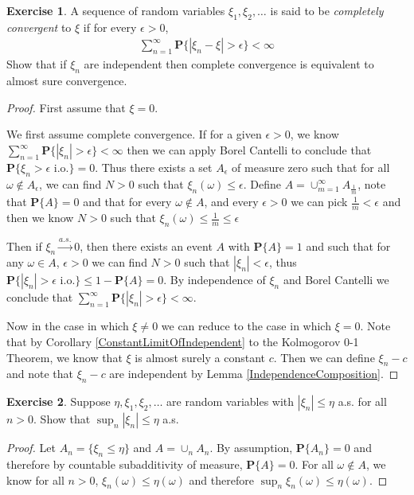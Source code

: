 \documentclass{amsbook}
\theoremstyle{definition}
\newtheorem{xca}{Exercise}
\theoremstyle{remark}
\newcommand{\probability}[1]{\textbf{P}\{#1\}}
\newcommand{\abs}[1]{\left \vert #1 \right \vert}
\newcommand{\toas}{\overset{a.s.}\to}
\begin{document}
\begin{xca}A sequence of random variables $\xi_1, \xi_2, \dots$ is said
  to be \emph{completely convergent} to $\xi$ if for every $\epsilon > 0$,
\begin{align*}
\sum_{n=1}^\infty \probability{\abs{\xi_n - \xi} > \epsilon} < \infty
\end{align*}
Show that if $\xi_n$ are independent then complete convergence is
equivalent to almost sure convergence.
\end{xca}
\begin{proof}
First assume that $\xi=0$.  

We first assume complete convergence.  If for a given $\epsilon > 0$, we know $\sum_{n=1}^\infty
\probability{\abs{\xi_n} > \epsilon} < \infty$ then we can apply
Borel Cantelli to conclude that $\probability{\xi_n > \epsilon \text{ i.o.}} =
0$.  Thus there exists a set $A_\epsilon$ of measure zero such that
for all $\omega \notin A_\epsilon$, we can find $N>0$ such that
$\xi_n(\omega) \leq \epsilon$.  Define $A = \cup_{m=1}^\infty A_\frac{1}{m}$,
note that $\probability{A} = 0$ and that for every $\omega \notin A$,
and every $\epsilon >0$ we can pick $\frac{1}{m} < \epsilon$  and then
we know  $N>0$ such that $\xi_n(\omega) \leq \frac{1}{m} \leq \epsilon$

Then if $\xi_n \toas 0$, then there
exists an event $A$ with $\probability{A} = 1$ and such that for any
$\omega \in A$, $\epsilon>0$ we can find $N > 0$ such that
$\abs{\xi_n} < \epsilon$, thus $\probability{\abs{\xi_n} > \epsilon
  \text{ i.o.}} \leq 1 - \probability{A} = 0$.  By independence of
$\xi_n$ and Borel Cantelli we conclude that $\sum_{n=1}^\infty
\probability{\abs{\xi_n} > \epsilon} < \infty$.

Now in the case in which $\xi \neq 0$ we can reduce to the case in
which $\xi = 0$.  Note that by Corollary
\ref{ConstantLimitOfIndependent} to the Kolmogorov 0-1 Theorem, we
know that $\xi$ is almost surely a constant $c$.  Then we can define $\xi_n
- c$ and note that $\xi_n - c$ are independent by Lemma \ref{IndependenceComposition}.
\end{proof}

\begin{xca}Suppose $\eta, \xi_1, \xi_2, \dots$ are random variables with
  $\abs{\xi_n} \leq \eta$ a.s. for all $n > 0$.  Show that $\sup_n
  \abs{\xi_n} \leq \eta$ a.s.
\end{xca}
\begin{proof}
Let $A_n = \lbrace \xi_n \leq \eta \rbrace$ and $A = \cup_n A_n$.
By assumption,
$\probability{A_n} =0$ and therefore by countable subadditivity of measure,
$\probability{A} = 0$.  For all $\omega \notin A$, we know for all
$n>0$, $\xi_n(\omega) \leq \eta(\omega)$ and therefore
$\sup_n\xi_n(\omega) \leq \eta(\omega)$.
\end{proof}
\end{document}
